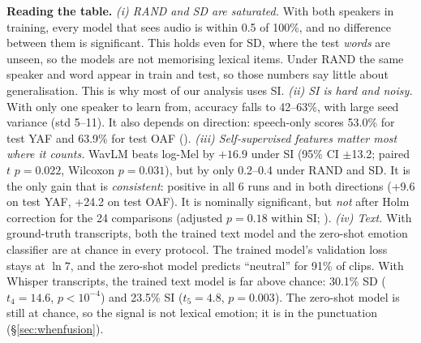 \textbf{Reading the table.}
\emph{(i) RAND and SD are saturated.} With both speakers in training, every model that sees audio is within 0.5\pp{} of 100\%, and no difference between them is significant.
This holds even for SD, where the test \emph{words} are unseen, so the models are not memorising lexical items.
Under RAND the same speaker and word appear in train and test, so those numbers say little about generalisation.
This is why most of our analysis uses SI.
\emph{(ii) SI is hard and noisy.} With only one speaker to learn from, accuracy falls to 42--63\%, with large seed variance (std 5--11\pp).
It also depends on direction: speech-only scores 53.0\% for test YAF and 63.9\% for test OAF ().
\emph{(iii) Self-supervised features matter most where it counts.} WavLM beats log-Mel by $+16.9$\pp{} under SI (95\% CI $\pm$13.2; paired $t$ $p=0.022$, Wilcoxon $p=0.031$), but by only 0.2--0.4\pp{} under RAND and SD.
It is the only gain that is \emph{consistent}: positive in all 6 runs and in both directions (+9.6\pp{} on test YAF, +24.2\pp{} on test OAF). It is nominally significant, but \emph{not} after Holm correction for the 24 comparisons (adjusted $p=0.18$ within SI; ).
\emph{(iv) Text.} With ground-truth transcripts, both the trained text model and the zero-shot emotion classifier are at chance in every protocol.
The trained model's validation loss stays at $\ln 7$, and the zero-shot model predicts ``neutral'' for 91\% of clips.
With Whisper transcripts, the trained text model is far above chance: 30.1\% SD ($t_4=14.6$, $p<10^{-4}$) and 23.5\% SI ($t_5=4.8$, $p=0.003$).
The zero-shot model is still at chance, so the signal is not lexical emotion; it is in the punctuation (\S\ref{sec:whenfusion}).


